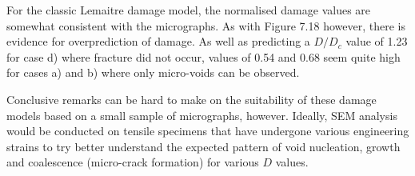 \documentclass[sn-mathphys,Numbered,draft]{sn-jnl}%
\begin{document}
For the classic Lemaitre damage model, the normalised damage values are somewhat consistent with the micrographs. As with Figure 7.18 however, there is evidence for overprediction of damage. As well as predicting a $D/D_c$ value of 1.23 for case d) where fracture did not occur, values of 0.54 and 0.68 seem quite high for cases a) and b) where only micro-voids can be observed. 

Conclusive remarks can be hard to make on the suitability of these damage models based on a small sample of micrographs, however. Ideally, SEM analysis would be conducted on tensile specimens that have undergone various engineering strains \cite{liu_microstructure_2017} to try better understand the expected pattern of void nucleation, growth and coalescence (micro-crack formation) for various $D$ values.
\end{document}
